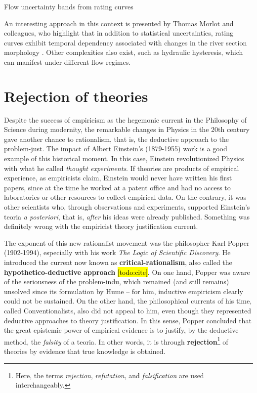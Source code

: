 \documentclass[./main_en.tex]{subfiles}
\begin{document}
\begin{simplebox}[
    float=htb,
    label={destaque_curvas_chave},
    nameref={Rating Curves}
    ]{Flow uncertainty bands from rating curves}
\begin{minipage}[t]{\linewidth}
    \par An interesting approach in this context is presented by Thomas Morlot and colleagues, who highlight that in addition to statistical uncertainties, rating curves exhibit temporal dependency associated with changes in the river section morphology \cite{Morlot2014}. Other complexities also exist, such as hydraulic hysteresis, which can manifest under different flow regimes.
    \end{minipage}
\label{box:rating-curve}
\normalsize
\end{simplebox}


\section{Rejection of theories} \label{sec:epis:popper}

\par Despite the success of \gls{empiricism} as the hegemonic current in the Philosophy of Science during modernity, the remarkable changes in Physics in the 20th century gave another chance to \gls{rationalism}, that is, the deductive approach to the \gls{problem-just}. The impact of Albert Einstein's (1879-1955) work is a good example of this historical moment. In this case, Einstein revolutionized Physics with what he called \textit{thought experiments}. If theories are products of empirical experience, as empiricists claim, Einstein would never have written his first papers, since at the time he worked at a patent office and had no access to laboratories or other resources to collect empirical data. On the contrary, it was other scientists who, through observations and experiments, supported Einstein's \gls{teoria} \textit{a posteriori}, that is, \textit{after} his ideas were already published. Something was definitely wrong with the empiricist theory justification current.

\par The exponent of this new rationalist movement was the philosopher Karl Popper (1902-1994), especially with his work \textit{The Logic of Scientific Discovery}. He introduced the current now known as \textbf{\gls{critical-rationalism}}, also called the \textbf{hypothetico-deductive approach} \hl{[todo:cite]}. On one hand, Popper was aware of the seriousness of the \gls{problem-indu}, which remained (and still remains) unsolved since its formulation by Hume – for him, inductive \gls{empiricism} clearly could not be sustained. On the other hand, the philosophical currents of his time, called Conventionalists, also did not appeal to him, even though they represented deductive approaches to theory justification. In this sense, Popper concluded that the great epistemic power of empirical evidence is to justify, by the deductive method, the \textit{falsity} of a \gls{teoria}. In other words, it is through \textbf{rejection}\footnote{Here, the terms \textit{rejection}, \textit{refutation}, and \textit{falsification} are used interchangeably.} of theories by evidence that true knowledge is obtained.
\end{document}
